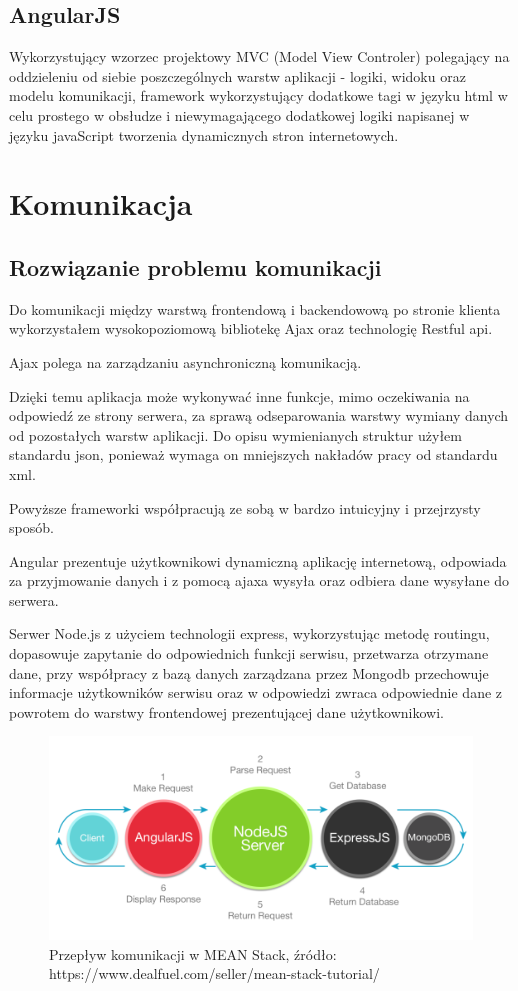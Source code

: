 \documentclass[12pt]{report}
\begin{document}
\subsection{AngularJS}
Wykorzystujący wzorzec projektowy MVC (Model View Controler) polegający na oddzieleniu od siebie poszczególnych warstw aplikacji - logiki, widoku oraz modelu komunikacji, framework wykorzystujący dodatkowe tagi w języku html w celu prostego w obsłudze i niewymagającego dodatkowej logiki napisanej w języku javaScript tworzenia dynamicznych stron internetowych.

\section{Komunikacja}

\subsection{Rozwiązanie problemu komunikacji}
Do komunikacji między warstwą frontendową i backendowową po stronie klienta wykorzystałem wysokopoziomową bibliotekę Ajax oraz technologię Restful api.

Ajax polega na zarządzaniu asynchroniczną komunikacją.

Dzięki temu aplikacja może wykonywać inne funkcje, mimo oczekiwania na odpowiedź ze strony serwera, za sprawą odseparowania warstwy wymiany danych od pozostałych warstw aplikacji.
Do opisu wymienianych struktur użyłem standardu json, ponieważ wymaga on mniejszych nakładów pracy od standardu xml.

Powyższe frameworki współpracują ze sobą w bardzo intuicyjny i przejrzysty sposób.

Angular prezentuje użytkownikowi dynamiczną aplikację internetową, odpowiada za przyjmowanie danych i z pomocą ajaxa wysyła oraz odbiera dane wysyłane do serwera.

Serwer Node.js z użyciem technologii express, wykorzystując metodę routingu, dopasowuje zapytanie do odpowiednich funkcji serwisu, przetwarza otrzymane dane, przy współpracy z bazą danych zarządzana przez Mongodb przechowuje informacje użytkowników serwisu oraz w odpowiedzi zwraca odpowiednie dane z powrotem do warstwy frontendowej prezentującej dane użytkownikowi.

\newpage
\begin{figure}[!hb]
\centering
\includegraphics[width=\textwidth,height=\textheight,keepaspectratio]{Meanex.png}
\caption{Przepływ komunikacji w MEAN Stack, źródło: https://www.dealfuel.com/seller/mean-stack-tutorial/}
\end{figure}
\end{document}
